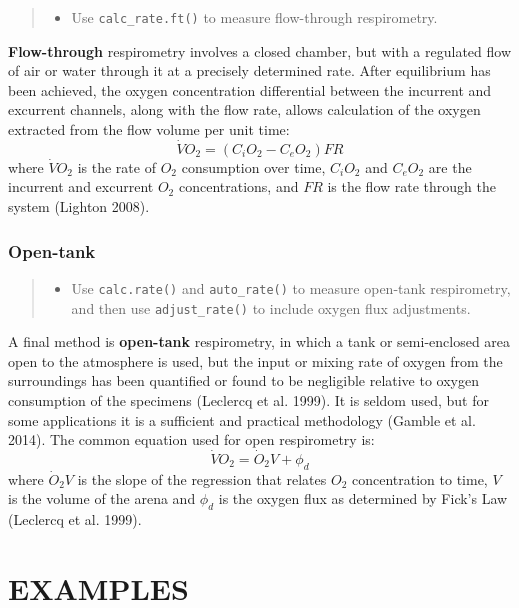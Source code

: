 \documentclass[]{book}
\providecommand{\tightlist}{%
  \setlength{\itemsep}{0pt}\setlength{\parskip}{0pt}}
\begin{document}
\begin{quote}
\begin{itemize}
\tightlist
\item
  Use \texttt{calc\_rate.ft()} to measure flow-through respirometry.
\end{itemize}
\end{quote}

\textbf{Flow-through} respirometry involves a closed chamber, but with a
regulated flow of air or water through it at a precisely determined
rate. After equilibrium has been achieved, the oxygen concentration
differential between the incurrent and excurrent channels, along with
the flow rate, allows calculation of the oxygen extracted from the flow
volume per unit time: \[\dot{V}O_2 = (C_iO_2 - C_eO_2)FR\] where
\(\dot{V}O_2\) is the rate of \(O_2\) consumption over time, \(C_iO_2\)
and \(C_eO_2\) are the incurrent and excurrent \(O_2\) concentrations,
and \(FR\) is the flow rate through the system (Lighton 2008).

\section{Open-tank}\label{open-tank}

\begin{quote}
\begin{itemize}
\tightlist
\item
  Use \texttt{calc.rate()} and \texttt{auto\_rate()} to measure
  open-tank respirometry, and then use \texttt{adjust\_rate()} to
  include oxygen flux adjustments.
\end{itemize}
\end{quote}

A final method is \textbf{open-tank} respirometry, in which a tank or
semi-enclosed area open to the atmosphere is used, but the input or
mixing rate of oxygen from the surroundings has been quantified or found
to be negligible relative to oxygen consumption of the specimens
(Leclercq et al. 1999). It is seldom used, but for some applications it
is a sufficient and practical methodology (Gamble et al. 2014). The
common equation used for open respirometry is:
\[\dot{V}O_2 = \dot O_2V + \phi_d\] where \(\dot O_2V\) is the slope of
the regression that relates \(O_2\) concentration to time, \(V\) is the
volume of the arena and \(\phi_d\) is the oxygen flux as determined by
Fick's Law (Leclercq et al. 1999).

\part*{EXAMPLES}\label{part-examples}
\end{document}
